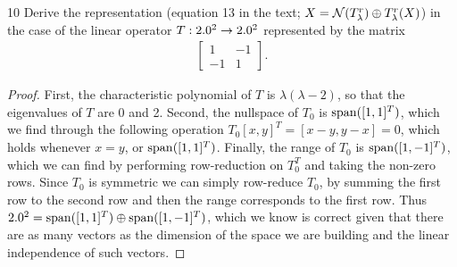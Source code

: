 \begin{exercise}{10}
Derive the representation (equation 13 in the text; $X = \mathcal{N}(T_\lambda^r) \oplus T_\lambda^r(X)$) in the case of the linear operator $T: 2.0^2 \to 2.0^2$ represented by the matrix
\begin{align}
    \begin{bmatrix}
        1  & -1\\
        -1 &  1
    \end{bmatrix}.
\end{align}
\end{exercise}
\begin{proof}
First, the characteristic polynomial of $T$ is $\lambda (\lambda - 2)$, so that the eigenvalues of $T$ are 0 and 2.
Second, the nullspace of $T_0$ is $\operatorname*{span}([1, 1]^T)$, which we find through the following operation $T_0 [x, y]^T = [x-y, y-x] = 0$, which holds whenever $x = y$, or $\operatorname*{span}([1, 1]^T)$.
Finally, the range of $T_0$ is $\operatorname*{span}([1, -1]^T)$, which we can find by performing row-reduction on $T_0^T$ and taking the non-zero rows.
Since $T_0$ is symmetric we can simply row-reduce $T_0$, by summing the first row to the second row and then the range corresponds to the first row.
Thus $2.0^2 = \operatorname*{span}([1, 1]^T) \oplus \operatorname*{span}([1, -1]^T)$, which we know is correct given that there are as many vectors as the dimension of the space we are building and the linear independence of such vectors.
\end{proof} 
